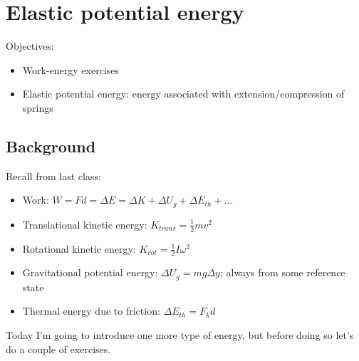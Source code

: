 \section{Elastic potential energy}
Objectives:
\begin{itemize}
\item Work-energy exercises
\item Elastic potential energy: energy associated with extension/compression of springs
\end{itemize}

\subsection{Background}
Recall from last class:
\begin{itemize}
\item Work: $W=Fd=\Delta{E}=\Delta{K}+\Delta{U_g}+\Delta{E_{th}}+...$
\item Translational kinetic energy: $K_{trans}=\frac{1}{2}mv^2$
\item Rotational kinetic energy: $K_{rot}=\frac{1}{2}I\omega^2$
\item Gravitational potential energy: $\Delta{U_g}=mg\Delta{y}$; always from some reference state
\item Thermal energy due to friction: $\Delta{E_{th}}=F_k d$
\end{itemize}

Today I'm going to introduce one more type of energy, but before doing so let's do a couple of exercises.

